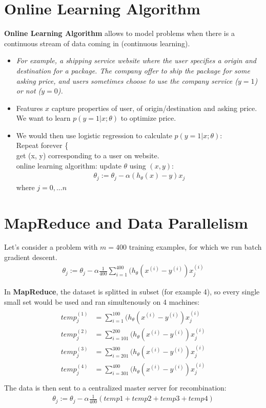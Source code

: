 \documentclass[a4paper,12pt]{report}
\begin{document}
\section{Online Learning Algorithm}
\textbf{Online Learning Algorithm} allows to model problems when there is a continuous stream of data coming in (continuous learning). \\
\begin{itemize}
\item \textit{For example, a shipping service website where the user specifies a origin and destination for a package. The company offer to ship the package for some asking price, and users sometimes choose to use the company service ($y=1$) or not ($y=0$).}
\item Features $x$ capture properties of user, of origin/destination and asking price. We want to learn $p(y=1|x; \theta)$ to optimize price. 
\item We would then use logistic regression to calculate $p(y=1|x; \theta)$: \\
Repeat forever \{ \\
get (x, y) corresponding to a user on website. \\
online learning algorithm:
update $\theta$ using $(x, y)$:
\begin{align}
\theta_j := \theta_j -\alpha (h_{\theta}(x) - y)x_j 
\end{align}
where $j=0, ...n$
\end{itemize}

\section{MapReduce and Data Parallelism}
Let's consider a problem with $m=400$ training examples, for which we run batch gradient descent.
\begin{align}
\theta_j := \theta_j - \alpha \frac{1}{400} \sum_{i=1} ^400 (h_{\theta}(x^{(i)} - y^{(i)}) x_j ^{(i)}
\end{align}

In \textbf{MapReduce}, the dataset is splitted in subset (for example 4), so  every single small set would be used and ran simultenously on 4 machines:
\begin{align}
\begin{split}
temp_j ^{(1)} & =\sum_{i=1} ^100 (h_{\theta}(x^{(i)} - y^{(i)}) x_j ^{(i)} \\
temp_j ^{(2)} & =\sum_{i=101} ^200 (h_{\theta}(x^{(i)} - y^{(i)}) x_j ^{(i)} \\
temp_j ^{(3)} & =\sum_{i=201} ^300 (h_{\theta}(x^{(i)} - y^{(i)}) x_j ^{(i)} \\
temp_j ^{(4)} & =\sum_{i=301} ^400 (h_{\theta}(x^{(i)} - y^{(i)}) x_j ^{(i)} \\
\end{split}
\end{align}
The data is then sent to a centralized master server for recombination:
\begin{align}
\theta_j := \theta_j - \alpha \frac{1}{400} (temp1 + temp2 + temp3+ temp4)
\end{align}
\end{document}
